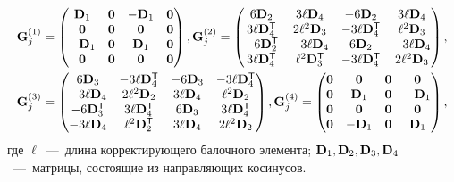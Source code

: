 \begin{equation}
	\begin{gathered}
	\mathbf{G}_j^{(1)} =
	\begin{pmatrix}
		\mathbf{D}_1 & \mathbf{0} & -\mathbf{D}_1 & \mathbf{0} \\
		\mathbf{0} & \mathbf{0} & \mathbf{0} & \mathbf{0} \\
		-\mathbf{D}_1 & \mathbf{0} & \mathbf{D}_1 & \mathbf{0} \\
		\mathbf{0} & \mathbf{0} & \mathbf{0} & \mathbf{0} \\
	\end{pmatrix},
	\mathbf{G}_j^{(2)} =
	\begin{pmatrix}
		6 \mathbf{D}_2 & 3 \ell \mathbf{D}_4 & -6 \mathbf{D}_2 & 3 \ell \mathbf{D}_4 \\
		3 \ell \mathbf{D} ^ \mathsf{T}_4 & 2 \ell ^ 2 \mathbf{D}_3 & -3 \ell \mathbf{D} ^ \mathsf{T}_4 & \ell ^ 2 \mathbf{D}_3 \\
		-6 \mathbf{D} ^ \mathsf{T}_2 & -3 \ell \mathbf{D}_4 & 6 \mathbf{D}_2 & -3 \ell \mathbf{D}_4 \\
		3 \ell \mathbf{D} ^ \mathsf{T}_4 & \ell ^ 2 \mathbf{D} ^ \mathsf{T}_3 & -3 \ell \mathbf{D} ^ \mathsf{T}_4 & 2 \ell ^ 2 \mathbf{D}_3
	\end{pmatrix}, \\
	\mathbf{G}_j^{(3)} =
	\begin{pmatrix}
		6 \mathbf{D}_3 & -3 \ell \mathbf{D} ^ \mathsf{T}_4 & -6 \mathbf{D}_3 & -3 \ell \mathbf{D} ^ \mathsf{T}_4 \\
		-3 \ell \mathbf{D}_4 & 2 \ell ^ 2 \mathbf{D}_2 & 3 \ell \mathbf{D}_4 & \ell ^ 2 \mathbf{D}_2 \\
		-6 \mathbf{D} ^ \mathsf{T}_3 & 3 \ell \mathbf{D} ^ \mathsf{T}_4 & 6 \mathbf{D}_3 & 3 \ell \mathbf{D} ^ \mathsf{T}_4 \\
		-3 \ell \mathbf{D}_4 & \ell ^ 2 \mathbf{D} ^ \mathsf{T}_2 & 3 \ell \mathbf{D}_4 & 2 \ell ^ 2 \mathbf{D}_2
	\end{pmatrix},
	\mathbf{G}_j^{(4)} =
	\begin{pmatrix}
		\mathbf{0} & \mathbf{0} & \mathbf{0} & \mathbf{0} \\
		\mathbf{0} & \mathbf{D}_1 & \mathbf{0} & -\mathbf{D}_1 \\
		\mathbf{0} & \mathbf{0} & \mathbf{0} & \mathbf{0} \\
		\mathbf{0} & -\mathbf{D}_1 & \mathbf{0} & \mathbf{D}_1 \\
	\end{pmatrix},
	\end{gathered}
\end{equation}
где $ \ell $~---~длина корректирующего балочного элемента; $ \mathbf{D}_1, \mathbf{D}_2, \mathbf{D}_3, \mathbf{D}_4 $~---~матрицы, состоящие из направляющих косинусов.

